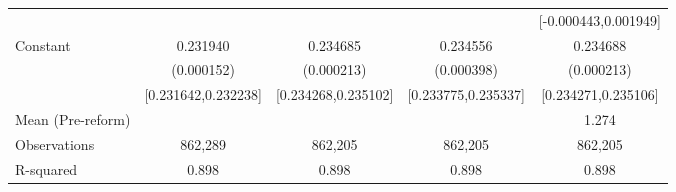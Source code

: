 {\begin{tabular}{l*{4}{c}}
                    &                     &                     &                     &[-0.000443,0.001949]         \\
Constant            &    0.231940\sym{***}&    0.234685\sym{***}&    0.234556\sym{***}&    0.234688\sym{***}\\
                    &  (0.000152)         &  (0.000213)         &  (0.000398)         &  (0.000213)         \\
                    &[0.231642,0.232238]         &[0.234268,0.235102]         &[0.233775,0.235337]         &[0.234271,0.235106]         \\
\midrule
Mean (Pre-reform)   &                     &                     &                     &       1.274         \\
Observations        &     862,289         &     862,205         &     862,205         &     862,205         \\
R-squared           &       0.898         &       0.898         &       0.898         &       0.898         \\
\bottomrule
\end{tabular}
}

